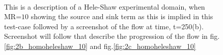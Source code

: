 \documentclass[preprint,authoryear,12pt]{elsarticle}
\begin{document}
\begin{figure}
\centering
{}\\[2mm]%
%
\caption{This is a description of a Hele-Shaw experimental domain, when MR=$10$ showing the source and sink term as this is implied in this test-case followed by a screenshot of the flow at time, t=250(b). Screenshot will follow that describe the progression of the flow in fig.\ref{fig:2b_homoheleshaw_10} and fig.\ref{fig:2c_homoheleshaw_10}}
\label{fig:2a_homoheleshaw_10}
\end{figure}
\end{document}
